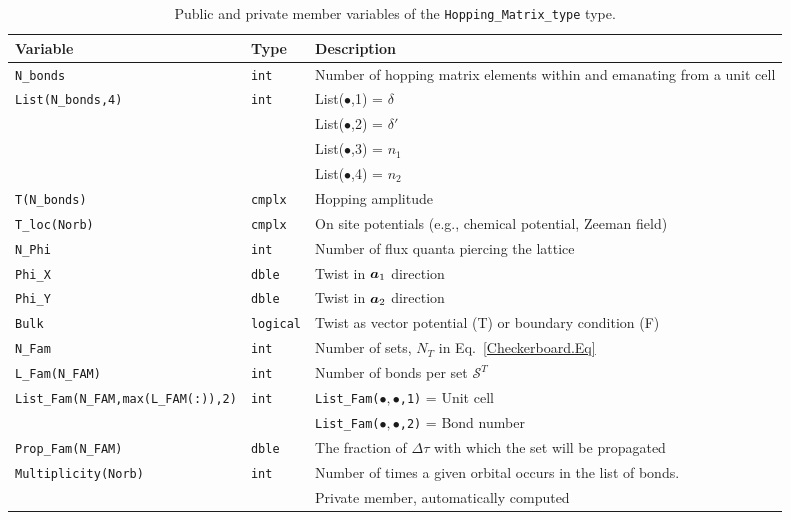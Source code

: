 \begin{table}[h]
	\begin{center}
		\begin{tabular}{@{} p{} @{} p{} p{} @{}}\toprule
			Variable                 & Type            & Description \\\midrule
			\texttt{N\_bonds}        & \texttt{int}    & Number of  hopping  matrix elements within and  emanating from   a unit cell   \\
			\texttt{List(N\_bonds,4)}& \texttt{int}    & List($\bullet$,1) =   $\delta$ \\
			&                 & List($\bullet$,2) =   $\delta'$ \\
			&                 & List($\bullet$,3) =   $n_1$     \\
			&                 & List($\bullet$,4) =   $n_2$     \\ 
			\texttt{T(N\_bonds)}     & \texttt{cmplx}  & Hopping amplitude   \\
			\texttt{T\_loc(Norb)}    & \texttt{cmplx}  & On site  potentials (e.g., chemical potential, Zeeman field)   \\
			\texttt{N\_Phi}          & \texttt{int}    & Number of  flux quanta piercing the lattice   \\
			\texttt{Phi\_X}          & \texttt{dble}   & Twist in $\boldsymbol{a}_1$  direction   \\
			\texttt{Phi\_Y}          & \texttt{dble}   & Twist in $\boldsymbol{a}_2$  direction   \\
			\texttt{Bulk}            & \texttt{logical}& Twist as vector potential (T) or  boundary condition (F)  \\
			\texttt{N\_Fam}          & \texttt{int}    & Number of  sets, $N_T$ in Eq.~\eqref{Checkerboard.Eq}   \\
			\texttt{L\_Fam(N\_FAM)}  & \texttt{int}    & Number of bonds per set $\mathcal{S}^{T}$ \\    
			\texttt{List\_Fam(N\_FAM,max(L\_FAM(:)),2)}& \texttt{int} & \texttt{List\_Fam($ \bullet,\bullet $,1)} =  Unit cell \\
			&                        &          \texttt{List\_Fam($\bullet,\bullet$,2)} =   Bond number \\
			\texttt{Prop\_Fam(N\_FAM)} & \texttt{dble}         & The fraction of $\Delta \tau$ with which the set will be propagated   \\
                        \midrule
			\texttt{Multiplicity(Norb)}& \texttt{int}  & Number of  times a  given orbital  occurs in the list of bonds.\\ && Private member, automatically computed  \\\bottomrule
		\end{tabular}
		\caption{Public and private member variables of the \texttt{Hopping\_Matrix\_type}  type.
			\label{table:Hopping_matrix}}
	\end{center}
\end{table}

